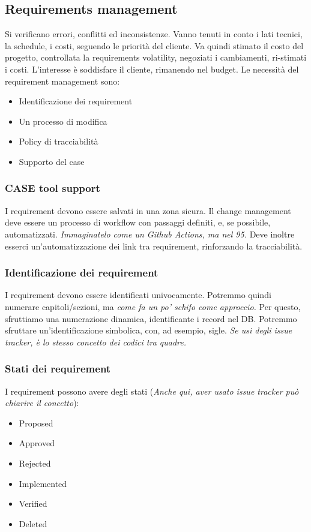 \documentclass[11pt]{article}
\begin{document}
\subsection{Requirements management}
Si verificano errori, conflitti ed inconsistenze. Vanno tenuti in conto i lati tecnici, la schedule, i costi, seguendo le priorità del cliente. 
Va quindi stimato il costo del progetto, controllata la requirements \gls{volatility}, negoziati i cambiamenti, ri-stimati i costi. L'interesse è soddisfare il cliente, rimanendo nel budget. 
Le necessità del requirement management sono:
\begin{itemize}
    \item Identificazione dei requirement
    \item Un processo di modifica
    \item Policy di tracciabilità
    \item Supporto del \gls{case}
\end{itemize}
\subsubsection{CASE tool support}
I requirement devono essere salvati in una zona sicura. Il change management deve essere un processo di workflow con passaggi definiti, e, se possibile, automatizzati. \textit{Immaginatelo come un Github Actions, ma nel 95.} Deve inoltre esserci un'automatizzazione dei link tra requirement, rinforzando la tracciabilità.
\subsubsection{Identificazione dei requirement}
I requirement devono essere identificati univocamente. Potremmo quindi numerare capitoli/sezioni, ma \textit{come fa un po' schifo come approccio.} Per questo, sfruttiamo una numerazione dinamica, identificante i record nel DB. Potremmo sfruttare un'identificazione simbolica, con, ad esempio, sigle. \textit{Se usi degli issue tracker, è lo stesso concetto dei codici tra quadre.}
\subsubsection{Stati dei requirement}
I requirement possono avere degli stati (\textit{Anche qui, aver usato issue tracker può chiarire il concetto}):
\begin{itemize}
    \item Proposed
    \item Approved
    \item Rejected
    \item Implemented
    \item Verified 
    \item Deleted
\end{itemize}
\end{document}
